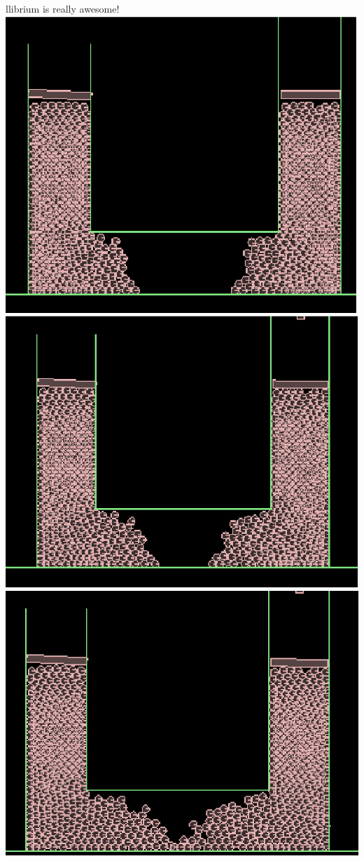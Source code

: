 \documentclass[a4paper,11pt]{article}
\begin{document}
{llibrium is really awesome!\\

\includegraphics[scale = 0.4]{image10} \hspace{0.5in} \includegraphics[scale = 0.4]{image11} \hspace{0.5in} \includegraphics[scale = 0.4]{image12}
}
\end{document}
